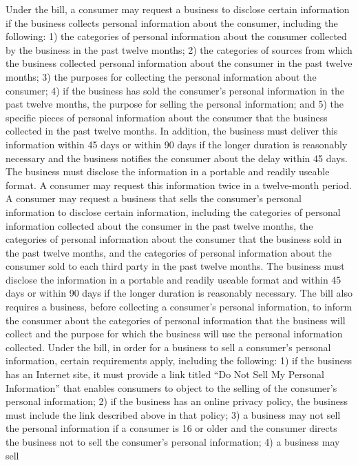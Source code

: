 Under the bill, a consumer may request a business to disclose certain
information if the business collects personal information about the consumer,
including the following: 1) the categories of personal information about the
consumer collected by the business in the past twelve months; 2) the categories of
sources from which the business collected personal information about the consumer
in the past twelve months; 3) the purposes for collecting the personal information
about the consumer; 4) if the business has sold the consumer's personal information
in the past twelve months, the purpose for selling the personal information; and 5)
the specific pieces of personal information about the consumer that the business
collected in the past twelve months. In addition, the business must deliver this
information within 45 days or within 90 days if the longer duration is reasonably
necessary and the business notifies the consumer about the delay within 45 days.
The business must disclose the information in a portable and readily useable format.
A consumer may request this information twice in a twelve-month period.
A consumer may request a business that sells the consumer's personal
information to disclose certain information, including the categories of personal
information collected about the consumer in the past twelve months, the categories
of personal information about the consumer that the business sold in the past twelve
months, and the categories of personal information about the consumer sold to each
third party in the past twelve months. The business must disclose the information
in a portable and readily useable format and within 45 days or within 90 days if the
longer duration is reasonably necessary.
The bill also requires a business, before collecting a consumer's personal
information, to inform the consumer about the categories of personal information
that the business will collect and the purpose for which the business will use the
personal information collected. Under the bill, in order for a business to sell a
consumer's personal information, certain requirements apply, including the
following: 1) if the business has an Internet site, it must provide a link titled “Do Not
Sell My Personal Information” that enables consumers to object to the selling of the
consumer's personal information; 2) if the business has an online privacy policy, the
business must include the link described above in that policy; 3) a business may not
sell the personal information if a consumer is 16 or older and the consumer directs
the business not to sell the consumer's personal information; 4) a business may sell
